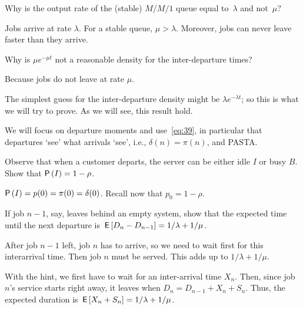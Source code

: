 \begin{exercise}\label{ex:dep}
Why is the output rate of the (stable) $M/M/1$ queue equal to~$\lambda$ and not~$\mu$?
\begin{solution}
Jobs arrive at rate $\lambda$. For a stable queue, $\mu>\lambda$. Moreover,  jobs can never leave faster than they arrive.
\end{solution}
\end{exercise}


\begin{exercise}
Why is $\mu e^{-\mu t}$ not a reasonable density for the
    inter-departure times?
    \begin{solution}
         Because jobs do not leave at rate $\mu$. 
    \end{solution}
\end{exercise}

The simplest guess for the inter-departure density might be $\lambda e^{-\lambda t}$; so this is what we will try to prove. As we will see, this result hold. 

We will focus on departure moments and use~\eqref{eq:39}, in particular that departures `see' what arrivals `see', i.e., $\delta(n)= \pi(n)$, and PASTA.


\begin{exercise}
 Observe that when a customer departs, the server can be either
    idle $I$ or busy $B$.   Show that $\P{I} = 1-\rho$.
    \begin{solution}
 $\P I = p(0) =\pi(0)=\delta(0)$.  Recall now that $p_0 = 1-\rho$.
    \end{solution}
\end{exercise}

\begin{exercise}
 If job $n-1$, say, leaves behind an empty system, show that the expected time until the next departure is $\,\mathsf{E}\left[D_n - D_{n-1}\right] = 1/\lambda + 1/\mu$. 
    \begin{hint}
      After job $n-1$ left, job $n$ has to arrive, so we need to wait first for this interarrival time. Then job $n$ must be served. This adds up to $1/\lambda + 1/\mu$. 
    \end{hint}
    \begin{solution}
With the hint, we first have to wait for an inter-arrival
    time $X_n$. Then, since job $n$'s service starts right away, it
    leaves when $D_n = D_{n-1}+X_n + S_n$. Thus, the expected duration is $\,\mathsf{E}\left[X_n + S_n\right]=1/\lambda + 1/\mu$. 
    \end{solution}
\end{exercise}

